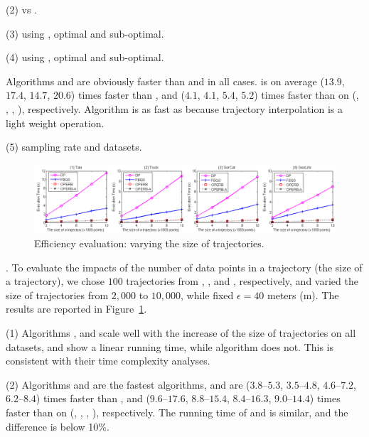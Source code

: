 \sstab (2) \ped vs \sed.

\sstab (3) using \ped, optimal and sub-optimal.

\sstab (4) using \sed, optimal and sub-optimal.

Algorithms \operb and \operba are obviously faster than \dpa and \fbqsa in all cases.
\operb is on average ($13.9$, $17.4$, $14.7$, {$20.6$}) times faster than \dpa, and ($4.1$, $4.1$, $5.4$, {$5.2$}) times faster than \fbqsa on (\taxi, \truck, \ucar, {\geolife}), respectively. Algorithm \operba is as fast as \operb because trajectory interpolation is a light weight operation.

\sstab (5) sampling rate and datasets.


\begin{figure}[tb!]
	\centering
	\includegraphics[scale = 0.465]{figures/Exp-time-size.png}
	\vspace{-2.5ex}
	\caption{\small Efficiency evaluation: varying the size of trajectories.}\label{fig:time-size}
	\vspace{-1ex}
\end{figure}

.
To evaluate the impacts of the number of data points in a trajectory (\ie the size of a trajectory),
we chose $100$ trajectories from \taxi, \truck, \ucar and \geolife, respectively,
and varied the size  of trajectories from $2,000$ to $10,000$, while fixed $\epsilon = 40$ meters (m).
The results are reported in Figure~\ref{fig:time-size}.

\sstab(1) Algorithms \operb, \operba and \fbqsa  scale well with the increase of the size of trajectories on all datasets,
and show a linear running time, while algorithm \dpa does not.
This is consistent with their time complexity analyses.

\sstab(2) Algorithms \operb and \operba are the fastest \lsa algorithms, and are {($3.8$--$5.3$, $3.5$--$4.8$, $4.6$--$7.2$, $6.2$--$8.4$)} times faster than \fbqsa,
and {($9.6$--$17.6$, $8.8$--$15.4$, $8.4$--$16.3$, $9.0$--$14.4$)} times faster than \dpa on (\taxi, \truck, \ucar, \geolife), respectively. The running time of \operb and \operba is similar, and the difference is below 10\%.
















